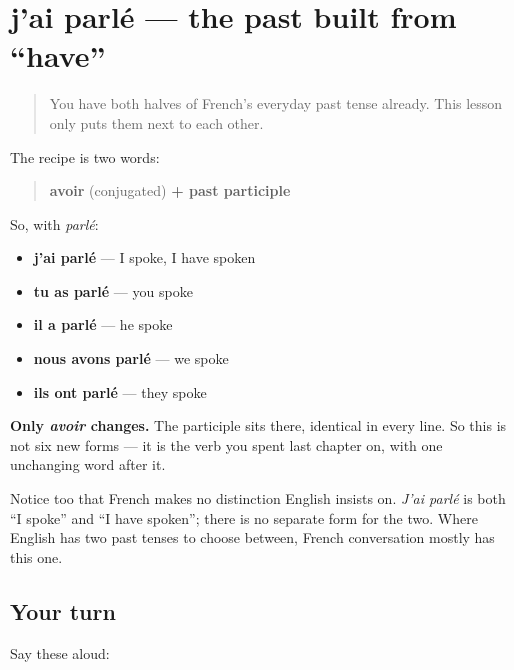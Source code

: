 \section[j'ai parlé]{j'ai parlé — the past built from \textquotedblleft{}have\textquotedblright{}}

\label{lesson:FR-C15-jai-parle}



\begin{quote}
You have both halves of French's everyday past tense already. This lesson only puts them next to each other.
\end{quote}

\begin{grammarlens}[title={Grammar Lens: avoir, then the participle}]
The recipe is two words:

\begin{quote}
\textbf{avoir} (conjugated) \textbf{+ past participle}
\end{quote}

So, with \emph{parlé}:

\begin{itemize}
\raggedright
  \item \textbf{j'ai parlé} — I spoke, I have spoken
  \item \textbf{tu as parlé} — you spoke
  \item \textbf{il a parlé} — he spoke
  \item \textbf{nous avons parlé} — we spoke
  \item \textbf{ils ont parlé} — they spoke
\end{itemize}

\textbf{Only \emph{avoir} changes.} The participle sits there, identical in every line. So this is not six new forms — it is the verb you spent last chapter on, with one unchanging word after it.

Notice too that French makes no distinction English insists on. \emph{J'ai parlé} is both \textquotedblleft{}I spoke\textquotedblright{} and \textquotedblleft{}I have spoken\textquotedblright{}; there is no separate form for the two. Where English has two past tenses to choose between, French conversation mostly has this one.
\end{grammarlens}

\subsection*{Your turn}
Say these aloud:


